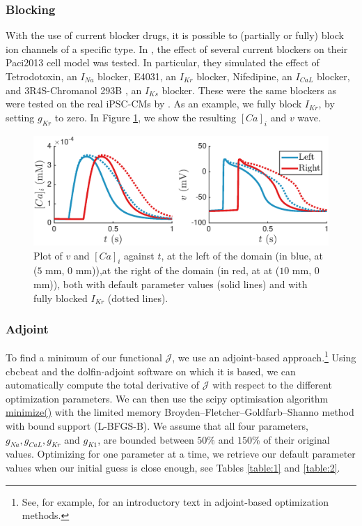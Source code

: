 \documentclass{article}
\begin{document}
\subsubsection{Blocking} \label{Blocking}
With the use of current blocker drugs, it is possible to (partially or fully) block ion channels of a specific type. In \cite{Paci2013}, the effect of several current blockers on their Paci2013 cell model was tested. In particular, they simulated the effect of Tetrodotoxin, an $I_{Na}$ blocker, E4031, an $I_{Kr}$ blocker, Nifedipine, an $I_{CaL}$ blocker, and 3R4S-Chromanol 293B , an $I_{Ks}$ blocker. These were the same blockers as were tested on the real iPSC-CMs by \cite{Ma2011}. As an example, we fully block $I_{Kr}$, by setting $g_{Kr}$ to zero. In Figure \ref{fig:blocking}, we show the resulting $[Ca]_i$ and $v$ wave. 
%
\begin{figure}
   \includegraphics[width=1\linewidth]{blocking} 
    \caption{Plot of $v$ and $[Ca]_i$ against $t$, at the left of the domain (in blue, at ($5$ mm, $0$ mm)),at the right of the domain (in red, at at ($10$ mm, $0$ mm)), both with default parameter values (solid lines) and with fully blocked $I_{Kr}$ (dotted lines).}
    \label{fig:blocking}
\end{figure}
%
\subsubsection{Adjoint} \label{Adjoint}
To find a minimum of our functional $\mathcal{J}$, we use an adjoint-based approach.\footnote{See, for example, \cite{Gunzburger} for an introductory text in adjoint-based optimization methods.} Using cbcbeat and the dolfin-adjoint software on which it is based, we can automatically compute the total derivative of $\mathcal{J}$ with respect to the different optimization parameters. We can then use the scipy optimisation algorithm \url{minimize()} with the limited memory Broyden–Fletcher–Goldfarb–Shanno method with bound support (L-BFGS-B). We assume that all four parameters, $g_{Na}, g_{CaL}, g_{Kr}$ and $g_{K1}$, are bounded between $50\%$ and $150\%$ of their original values. Optimizing for one parameter at a time, we retrieve our default parameter values when our initial guess is close enough, see Tables \ref{table:1} and \ref{table:2}.
\end{document}
